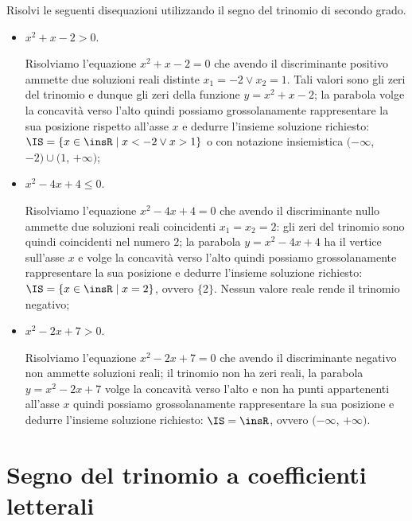 \begin{exrig}
\begin{esempio}
Risolvi le seguenti disequazioni utilizzando il segno del trinomio di secondo grado.
\begin{itemize}
\item $x^2+x-2>0$.

Risolviamo l'equazione $x^2+x-2=0$ che avendo il discriminante positivo ammette due soluzioni reali distinte $x_1=-2\vee x_2=1$. Tali valori sono gli zeri del trinomio e dunque gli zeri della funzione $y=x^2+x-2$; la parabola volge la concavità verso l'alto quindi possiamo grossolanamente rappresentare la sua posizione rispetto all'asse $x$ e dedurre l'insieme soluzione richiesto: $\IS=\{x\in \insR \mid x<-2\vee x>1\}$ o con notazione insiemistica $(-\infty$, $-2)\cup (1$, $+\infty)$;
\item $x^2-4x+4\le 0$.

Risolviamo l'equazione $x^2-4x+4=0$ che avendo il discriminante nullo ammette due soluzioni reali coincidenti $x_1=x_2=2$: gli zeri del trinomio sono quindi coincidenti nel numero $2$; la parabola $y=x^2-4x+4$ ha il vertice sull'asse $x$ e volge la concavità verso l'alto quindi possiamo grossolanamente rappresentare la sua posizione e dedurre l'insieme soluzione richiesto: $\IS=\{x\in \insR \mid x=2\}$, ovvero $\{2\}$. Nessun valore reale rende il trinomio negativo;
\item $x^2-2x+7>0$.

Risolviamo l'equazione $x^2-2x+7=0$ che avendo il discriminante negativo non ammette soluzioni reali; il trinomio non ha zeri reali, la parabola $y=x^2-2x+7$ volge la concavità verso l'alto e non ha punti appartenenti all'asse $x$ quindi possiamo grossolanamente rappresentare la sua posizione e dedurre l'insieme soluzione richiesto: $\IS=\insR$, ovvero $(-\infty$, $+\infty)$.
\end{itemize}
\begin{center}
 
\end{center}
\end{esempio}
\end{exrig}
\vspazio\ovalbox{\risolvii \ref{ese:4.8}, \ref{ese:4.9}, \ref{ese:4.10}, \ref{ese:4.11}, \ref{ese:4.12}, \ref{ese:4.13}, \ref{ese:4.14}, \ref{ese:4.15}, \ref{ese:4.16}, \ref{ese:4.17}, \ref{ese:4.18}, \ref{ese:4.19}, \ref{ese:4.20},}

\vspazio\ovalbox{ \ref{ese:4.21}, \ref{ese:4.22}, \ref{ese:4.23}}
\pagebreak
\section{Segno del trinomio a coefficienti letterali}

